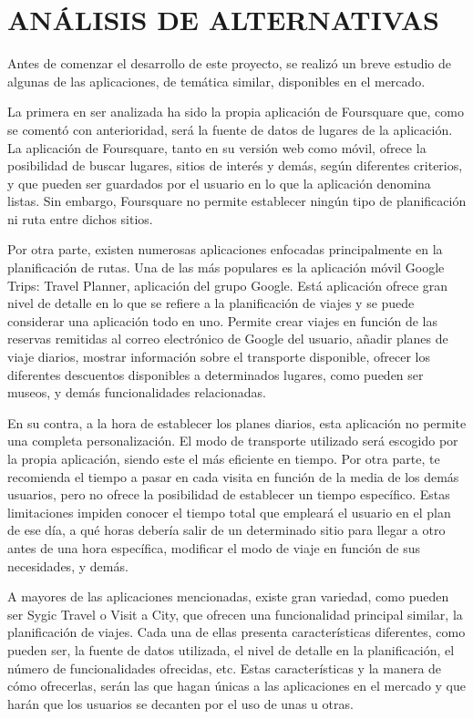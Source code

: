 \chapter[Análisis de alternativas]{
  \label{chp:analisisdealternativas}
  ANÁLISIS DE ALTERNATIVAS
}
\thispagestyle{numberingStyle}
\pagestyle{numberingStyle}



Antes de comenzar el desarrollo de este proyecto, se realizó un breve estudio de algunas de las aplicaciones, de temática similar, disponibles en el mercado. 

La primera en ser analizada ha sido la propia aplicación de Foursquare que, como se comentó con anterioridad, será la fuente de datos de lugares de la aplicación. La aplicación de Foursquare, tanto en su versión web como móvil, ofrece la posibilidad de buscar lugares, sitios de interés y demás, según diferentes criterios, y que pueden ser guardados por el usuario en lo que la aplicación denomina listas. Sin embargo, Foursquare no permite establecer ningún tipo de planificación ni ruta entre dichos sitios.

Por otra parte, existen numerosas aplicaciones enfocadas principalmente en la planificación de rutas. Una de las más populares es la aplicación móvil Google Trips: Travel Planner, aplicación del grupo Google. Está aplicación ofrece gran nivel de detalle en lo que se refiere a la planificación de viajes y se puede considerar una aplicación todo en uno. Permite crear viajes en función de las reservas remitidas al correo electrónico de Google del usuario, añadir planes de viaje diarios, mostrar información sobre el transporte disponible, ofrecer los diferentes descuentos disponibles a determinados lugares, como pueden ser museos, y demás funcionalidades relacionadas.

En su contra, a la hora de establecer los planes diarios, esta aplicación no permite una completa personalización. El modo de transporte utilizado será escogido por la propia aplicación, siendo este el más eficiente en tiempo. Por otra parte, te recomienda el tiempo a pasar en cada visita en función de la media de los demás usuarios, pero no ofrece la posibilidad de establecer un tiempo específico. Estas limitaciones impiden conocer el tiempo total que empleará el usuario en el plan de ese día, a qué horas debería salir de un determinado sitio para llegar a otro antes de una hora específica, modificar el modo de viaje en función de sus necesidades, y demás.


A mayores de las aplicaciones mencionadas, existe gran variedad, como pueden ser Sygic Travel o Visit a City, que ofrecen una funcionalidad principal similar, la planificación de viajes. Cada una de ellas presenta características diferentes, como pueden ser, la fuente de datos utilizada, el nivel de detalle en la planificación, el número de funcionalidades ofrecidas, etc. Estas características y la manera de cómo ofrecerlas, serán las que hagan únicas a las aplicaciones en el mercado y que harán que los usuarios se decanten por el uso de unas u otras.












